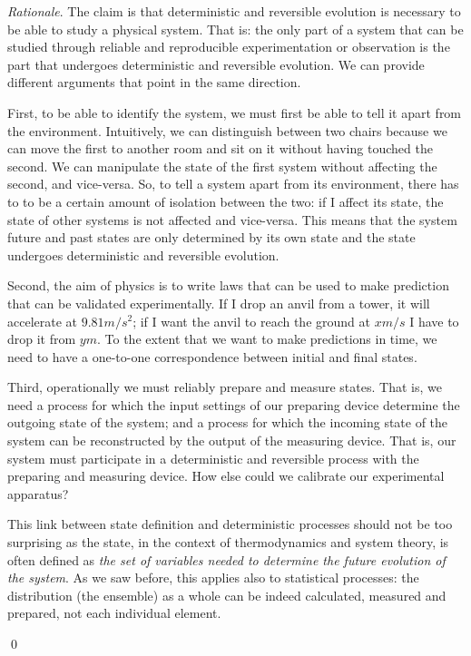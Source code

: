 \documentclass[aps,pra,10pt,twocolumn,floatfix,nofootinbib]{revtex4-1}
\theoremstyle{definition}
\newenvironment{rationale}{\emph{Rationale}.}{\qed}
\begin{document}
\begin{rationale}
The claim is that deterministic and reversible evolution is necessary to be able to study a physical system. That is: the only part of a system that can be studied through reliable and reproducible experimentation or observation is the part that undergoes deterministic and reversible evolution. We can provide different arguments that point in the same direction.

First, to be able to identify the system, we must first be able to tell it apart from the environment. Intuitively, we can distinguish between two chairs because we can move the first to another room and sit on it without having touched the second. We can manipulate the state of the first system without affecting the second, and vice-versa. So, to tell a system apart from its environment, there has to to be a certain amount of isolation between the two: if I affect its state, the state of other systems is not affected and vice-versa. This means that the system future and past states are only determined by its own state and the state undergoes deterministic and reversible evolution.

Second, the aim of physics is to write laws that can be used to make prediction that can be validated experimentally. If I drop an anvil from a tower, it will accelerate at $9.81 m/s^2$; if I want the anvil to reach the ground at $x m/s$ I have to drop it from $y m$. To the extent that we want to make predictions in time, we need to have a one-to-one correspondence between initial and final states.

Third, operationally we must reliably prepare and measure states. That is, we need a process for which the input settings of our preparing device determine the outgoing state of the system; and a process for which the incoming state of the system can be reconstructed by the output of the measuring device. That is, our system must participate in a deterministic and reversible process with the preparing and measuring device. How else could we calibrate our experimental apparatus?

This link between state definition and deterministic processes should not be too surprising as the state, in the context of thermodynamics and system theory, is often defined as \emph{the set of variables needed to determine the future evolution of the system}. As we saw before, this applies also to statistical processes: the distribution (the ensemble) as a whole can be indeed calculated, measured and prepared, not each individual element.


\end{rationale}
\end{document}
